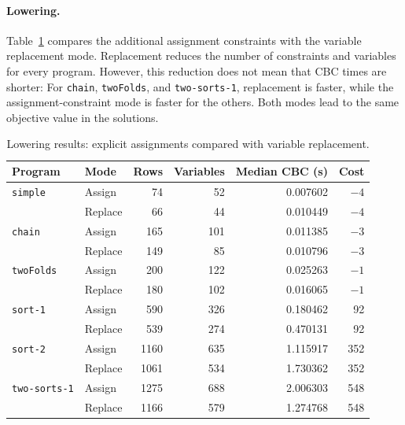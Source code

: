 \paragraph{Lowering.}

Table~\ref{tab:lowering-results} compares the additional assignment constraints with the variable replacement mode.
Replacement reduces the number of constraints and variables for every program.
However, this reduction does not mean that CBC times are shorter:
For \texttt{chain}, \texttt{twoFolds}, and \texttt{two-sorts-1}, replacement is faster, while the assignment-constraint mode is faster for the others.
Both modes lead to the same objective value in the solutions.

\begin{table}[htbp]
    \centering
    \small
    \begin{tabular}{llrrrr}
        \hline
        Program & Mode & Rows & Variables & Median CBC (s) & Cost \\
        \hline
        \texttt{simple}      & Assign  & 74   & 52  & 0.007602 & $-4$ \\
                            & Replace & 66   & 44  & 0.010449 & $-4$ \\
        \texttt{chain}       & Assign  & 165  & 101 & 0.011385 & $-3$ \\
                            & Replace & 149  & 85  & 0.010796 & $-3$ \\
        \texttt{twoFolds}    & Assign  & 200  & 122 & 0.025263 & $-1$ \\
                            & Replace & 180  & 102 & 0.016065 & $-1$ \\
        \texttt{sort-1}      & Assign  & 590  & 326 & 0.180462 & 92 \\
                            & Replace & 539  & 274 & 0.470131 & 92 \\
        \texttt{sort-2}      & Assign  & 1160 & 635 & 1.115917 & 352 \\
                            & Replace & 1061 & 534 & 1.730362 & 352 \\
        \texttt{two-sorts-1} & Assign  & 1275 & 688 & 2.006303 & 548 \\
                            & Replace & 1166 & 579 & 1.274768 & 548 \\
        \hline
    \end{tabular}
    \caption{Lowering results: explicit assignments compared with
        variable replacement.}
    \label{tab:lowering-results}
\end{table}

